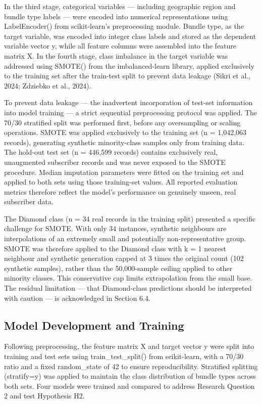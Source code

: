 In the third stage, categorical variables --- including geographic region and bundle type labels --- were encoded into numerical representations using LabelEncoder() from scikit-learn's preprocessing module. Bundle type, as the target variable, was encoded into integer class labels and stored as the dependent variable vector y, while all feature columns were assembled into the feature matrix X. In the fourth stage, class imbalance in the target variable was addressed using SMOTE() from the imbalanced-learn library, applied exclusively to the training set after the train-test split to prevent data leakage (Sikri et al., 2024; Zdziebko et al., 2024).

To prevent data leakage — the inadvertent incorporation of test-set information into model training — a strict sequential preprocessing protocol was applied. The 70/30 stratified split was performed first, before any oversampling or scaling operations. SMOTE was applied exclusively to the training set (n = 1,042,063 records), generating synthetic minority-class samples only from training data. The hold-out test set (n = 446,599 records) contains exclusively real, unaugmented subscriber records and was never exposed to the SMOTE procedure. Median imputation parameters were fitted on the training set and applied to both sets using those training-set values. All reported evaluation metrics therefore reflect the model's performance on genuinely unseen, real subscriber data.

The Diamond class (n = 34 real records in the training split) presented a specific challenge for SMOTE. With only 34 instances, synthetic neighbours are interpolations of an extremely small and potentially non-representative group. SMOTE was therefore applied to the Diamond class with k = 1 nearest neighbour and synthetic generation capped at 3 times the original count (102 synthetic samples), rather than the 50,000-sample ceiling applied to other minority classes. This conservative cap limits extrapolation from the small base. The residual limitation — that Diamond-class predictions should be interpreted with caution — is acknowledged in Section 6.4.


\subsection{Model Development and Training}

Following preprocessing, the feature matrix X and target vector y were split into training and test sets using train\_test\_split() from scikit-learn, with a 70/30 ratio and a fixed random\_state of 42 to ensure reproducibility. Stratified splitting (stratify=y) was applied to maintain the class distribution of bundle types across both sets. Four models were trained and compared to address Research Question 2 and test Hypothesis H2.

